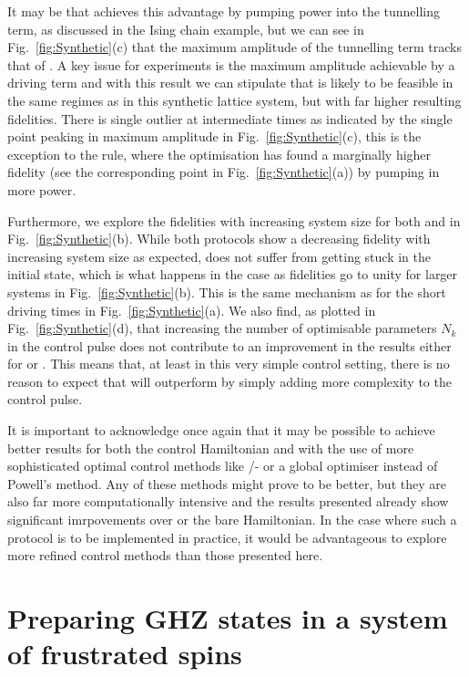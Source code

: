 It may be that  achieves this advantage by pumping power into the tunnelling term, as discussed in the Ising chain example, but we can see in Fig.~\ref{fig:Synthetic}(c) that the maximum amplitude of the tunnelling term tracks that of . A key issue for experiments is the maximum amplitude achievable by a driving term and with this result we can stipulate that  is likely to be feasible in the same regimes as  in this synthetic lattice system, but with far higher resulting fidelities. There is single outlier at intermediate times as indicated by the single point peaking in maximum amplitude in Fig.~\ref{fig:Synthetic}(c), this is the exception to the rule, where the optimisation has found a marginally higher fidelity (see the corresponding point in Fig.~\ref{fig:Synthetic}(a)) by pumping in more power.

Furthermore, we explore the fidelities with increasing system size for both  and  in Fig.~\ref{fig:Synthetic}(b). While both protocols show a decreasing fidelity with increasing system size as expected,  does not suffer from getting stuck in the initial state, which is what happens in the  case as fidelities go to unity for larger systems in Fig.~\ref{fig:Synthetic}(b). This is the same mechanism as for the short driving times in Fig.~\ref{fig:Synthetic}(a). We also find, as plotted in Fig.~\ref{fig:Synthetic}(d), that increasing the number of optimisable parameters $N_k$ in the control pulse does not contribute to an improvement in the results either for  or . This means that, at least in this very simple control setting, there is no reason to expect that  will outperform  by simply adding more complexity to the control pulse.

It is important to acknowledge once again that it may be possible to achieve better results for both the control Hamiltonian and  with the use of more sophisticated optimal control methods like /- or a global optimiser instead of Powell's method. Any of these methods might prove to be better, but they are also far more computationally intensive and the results presented already show significant imrpovements over  or the bare Hamiltonian. In the case where such a protocol is to be implemented in practice, it would be advantageous to explore more refined control methods than those presented here.

\section{Preparing GHZ states in a system of frustrated spins}\label{sec:6.4_ghz_states}

